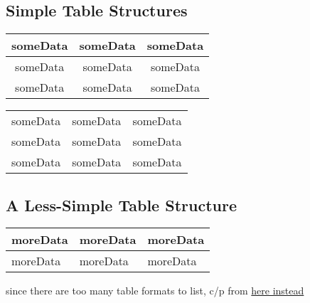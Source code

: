 \documentclass[12pt,twoside,a4paper]{article}
\begin{document}
\subsection*{Simple Table Structures}

\begin{tabular}{ c |c| c }
 someData & someData & someData \\
 \hline
 someData & someData & someData \\
 someData & someData & someData
\end{tabular}

\begin{tabular}{ |c|c|c| }
\hline
 someData & someData & someData \\
 someData & someData & someData \\
 someData & someData & someData \\
\hline
\end{tabular}

\subsection*{A Less-Simple Table Structure}
\begin{tabularx}{0.8\textwidth} {
  | >{\raggedright\arraybackslash}X
  | >{\centering\arraybackslash}X
  | >{\raggedleft\arraybackslash}X | }
 \hline
 moreData & moreData & moreData \\
 \hline
 moreData & moreData & moreData \\
\hline
\end{tabularx}
\newline since there are too many table formats to list, c/p from \href{https://www.overleaf.com/learn/latex/tables}{here instead}
\end{document}
